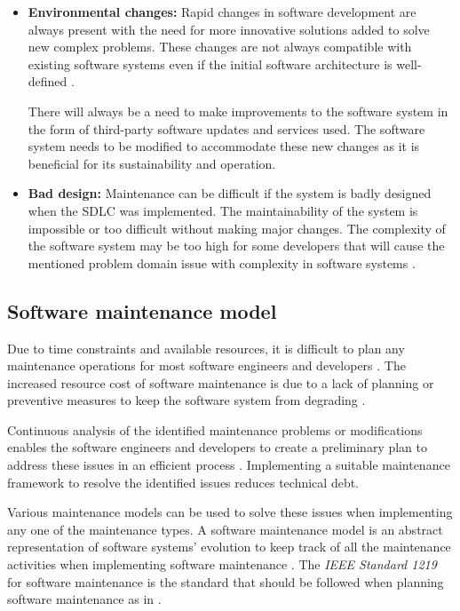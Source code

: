 \begin{itemize}
	\item \textbf{Environmental changes:} Rapid changes in software development are always present with the need for more innovative solutions added to solve new complex problems. These changes are not always compatible with existing software systems even if the initial software architecture is well-defined \cite{Ogheneovo2014}. \par There will always be a need to make improvements to the software system in the form of third-party software updates and services used. The software system needs to be modified to accommodate these new changes as it is beneficial for its sustainability and operation.
	\item \textbf{Bad design:} Maintenance can be difficult if the system is badly designed when the SDLC was implemented. The maintainability of the system is impossible or too difficult without making major changes. The complexity of the software system may be too high for some developers that will cause the mentioned problem domain issue with complexity in software systems \cite{Lenarduzzi2017}.
\end{itemize}

\clearpage

\subsection{Software maintenance model}\label{sec:ch1_maintenanceModel}
Due to time constraints and available resources, it is difficult to plan any maintenance operations for most software engineers and developers \cite{DeLeon-Sigg2020}. The increased resource cost of software maintenance is due to a lack of planning or preventive measures to keep the software system from degrading \cite{Alenezi2016}.\par Continuous analysis of the identified maintenance problems or modifications enables the software engineers and developers to create a preliminary plan to address these issues in an efficient process \cite{Port2017}. Implementing a suitable maintenance framework to resolve the identified issues reduces technical debt.\par Various maintenance models can be used to solve these issues when implementing any one of the maintenance types. A software maintenance model is an abstract representation of software systems' evolution to keep track of all the maintenance activities when implementing software maintenance \cite{Ren2011}. The \textit{IEEE Standard 1219} for software maintenance is the standard that should be followed when planning software maintenance as in . 

